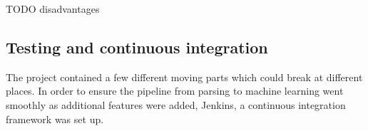 \documentclass[Report.tex]{subfiles}
\begin{document}
TODO disadvantages

\subsection{Testing and continuous integration}
The project contained a few different moving parts which could break at different places. In order to ensure the pipeline from parsing to machine learning went smoothly as additional features were added, Jenkins, a continuous integration framework was set up. 


\end{document}
